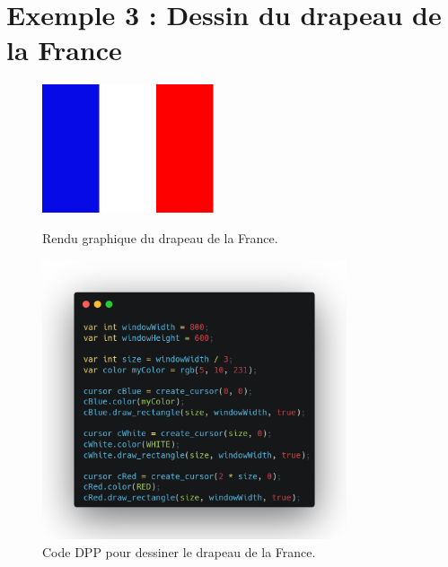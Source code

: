 \documentclass[12pt,a4paper]{report}
\begin{document}
\section{Exemple 3 : Dessin du drapeau de la France}
\begin{figure}[H]
    \centering
    \includegraphics[width=0.45\textwidth]{assets/render/france.png}
    \caption{Rendu graphique du drapeau de la France.}
    \includegraphics[width=0.8\textwidth]{assets/code/france_dpp}
    \caption{Code DPP pour dessiner le drapeau de la France.}
\end{figure}
\end{document}
